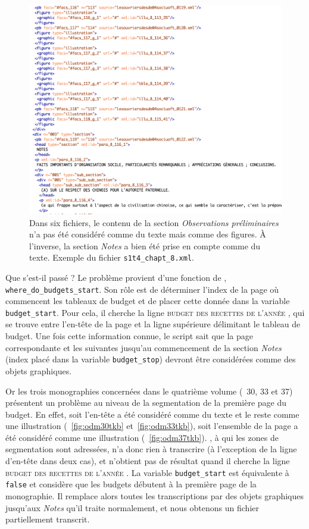 \begin{figure}[h]
    \centering
    \includegraphics[width=15cm]{img/deficit_transcrip.png}
    \caption[Exemple d'un déficit de transcription]{Dans six fichiers, le contenu de la section \textit{Observations préliminaires} n'a pas été considéré comme du texte mais comme des figures. À l'inverse, la section \textit{Notes} a bien été prise en compte comme du texte. Exemple du fichier \texttt{s1t4\_chapt\_8.xml}.}
    \label{fig:deficit}
\end{figure}

Que s'est-il passé ? Le problème provient d'une fonction de \lse, \texttt{where\_do\_\-budgets\_start}. Son  rôle est de déterminer l'index de la page où commencent les tableaux de budget et de placer cette donnée dans la variable \texttt{budget\_start}. Pour cela, il cherche la ligne \og \textsc{budget des recettes de l'année} \fg, qui se trouve entre l'en-tête de la page et la ligne supérieure délimitant le tableau de budget. Une fois cette information connue, le script sait que la page correspondante et les suivantes jusqu'au commencement de la section \textit{Notes} (index placé dans la variable \texttt{budget\_stop}) devront être considérées comme des objets graphiques.

Or les trois monographies concernées dans le quatrième volume (\no{}~30, 33 et 37) présentent un problème au niveau de la segmentation de la première page du budget. En effet, soit l'en-tête a été considéré comme du texte et le reste comme une illustration (\fig{}~\ref{fig:odm30tkb} et~\ref{fig:odm33tkb}), soit l'ensemble de la page a été considéré comme une illustration (\fig{}~\ref{fig:odm37tkb}). \kraken, à qui les zones de segmentation sont adressées, n'a donc rien à transcrire (à l'exception de la ligne d'en-tête dans deux cas), et \lse{} n'obtient pas de résultat quand il cherche la ligne \og \textsc{budget des recettes de l'année} \fg{}. La variable \texttt{budget\_start} est équivalente à \texttt{false} et \lse{} considère que les budgets débutent à la première page de la monographie. Il remplace alors toutes les transcriptions par des objets graphiques jusqu'aux \textit{Notes} qu'il traite normalement, et nous obtenons un fichier partiellement transcrit.

